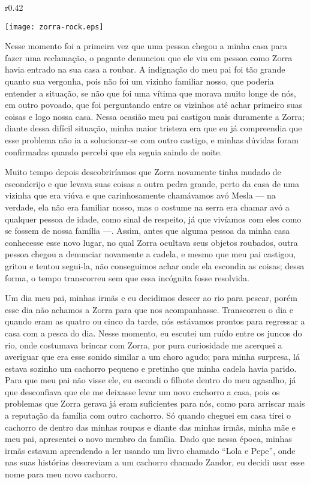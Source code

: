 \begin{wrapfigure}{r}{0.42\textwidth}
  \begin{center}
  \vspace{-10pt}
    \texttt{[image: zorra-rock.eps]}
  \end{center}
  \vspace{-20pt}
\end{wrapfigure}
Nesse momento foi a primeira vez que uma pessoa chegou a minha casa para fazer uma reclamação, o pagante denunciou que ele viu em pessoa como Zorra havia entrado na sua casa a roubar. 
A indignação do meu pai foi tão grande quanto sua vergonha, pois não foi um vizinho familiar nosso, que poderia entender a situação, se não que foi uma vítima que morava muito longe de nós, em outro povoado, que foi perguntando entre os vizinhos até achar primeiro suas coisas e logo nossa casa.
Nessa ocasião meu pai castigou mais duramente a Zorra; diante dessa difícil situação, minha maior tristeza era que eu já compreendia que esse problema não ia a solucionar-se com outro castigo, e minhas dúvidas foram confirmadas quando percebi que ela seguia saindo de noite. 

Muito tempo depois descobriríamos que Zorra novamente tinha mudado de esconderijo e que levava suas coisas a outra pedra grande, perto da casa de uma vizinha que era viúva e que carinhosamente chamávamos avó Mesla --- na verdade, ela não era familiar nosso, mas o costume na serra era chamar avó a qualquer pessoa de idade, como sinal de respeito, já que vivíamos com eles como se fossem de nossa família ---.
Assim, antes que alguma pessoa da minha casa conhecesse esse novo lugar, no qual Zorra ocultava seus objetos roubados, outra pessoa chegou a denunciar novamente a cadela, e mesmo que meu pai castigou, gritou e tentou segui-la, não conseguimos achar onde ela escondia as coisas; dessa forma, o tempo transcorreu sem que essa incógnita fosse resolvida. 

Um dia meu pai, minhas irmãs e eu decidimos descer ao rio para pescar, porém esse dia não achamos a Zorra para que nos acompanhasse. Transcorreu o dia e quando eram as quatro ou cinco da tarde, nós estávamos prontos para regressar a casa com a pesca do dia. Nesse momento, eu escutei um ruído entre os juncos do rio, onde costumava brincar com Zorra, por pura curiosidade me acerquei a averiguar que era esse sonido similar a um choro agudo; para minha surpresa, lá estava sozinho um cachorro pequeno e pretinho que minha cadela havia parido.  
Para que meu pai não visse ele, eu escondi o filhote dentro do meu agasalho, já que desconfiava que ele me deixasse levar um novo cachorro a casa, pois os problemas que Zorra gerava já eram suficientes para nós, como para arriscar mais a reputação da família com outro cachorro.
Só quando cheguei em casa tirei o cachorro de dentro das minhas roupas e diante das minhas irmãs, minha mãe e meu pai, apresentei o novo membro da família. Dado que nessa época, minhas irmãs estavam aprendendo a ler usando um livro chamado ``Lola e Pepe'', onde nas suas histórias descreviam a um cachorro chamado Zandor, eu decidi usar esse nome para meu novo cachorro. 

